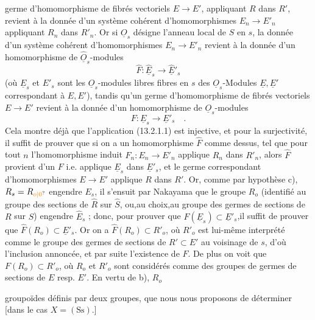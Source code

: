 germe d'homomorphisme de fibrés vectoriels $E\longrightarrow E'$, appliquant $R$ dans $R'$, revient à la donnée d'un système cohérent d'homomorphismes $E_n\longrightarrow E'_n$ appliquant $R_n$ dans $R'_n$. Or si $\underline O_s$ désigne l'anneau local de $S$ en $s$, la donnée d'un système cohérent d'homomorphismes $E_n\longrightarrow E'_n$ revient à la donnée d'un homomorphisme de $\widehat{\underline O}_s$-modules
\[
 \hat F:\widehat{\underline E}_s\longrightarrow\widehat{\underline E}'_s
\]
(où $\underline E_s$ et $E'_s$ sont les $\underline O_s$-modules libres fibres en $s$ des $\underline O_s$-Modules $\underline E,\underline E'$ correspondant à $E,E'$), tandis qu'un germe d'homomorphisme de fibrés vectoriels $E\longrightarrow E'$ revient à la donnée d'un homomorphisme de $\underline O_s$-modules
\[
 F:\underline E_s\longrightarrow\underline E'_s\quad.
\]
Cela montre déjà que l'application (13.2.1.1) est injective, et pour la surjectivité, il suffit de prouver que si on a un homomorphisme $\hat F$ comme dessus, tel que pour tout $n$ l'homomorphisme induit $F_n:E_n\longrightarrow E'_n$ applique $R_n$ dans $R'_n$, alors $\hat F$ provient d'un $F$ i.e. applique $\underline E_s$ dans $\underline E'_s$, et le germe correspondant d'homomorphismes $E\longrightarrow E'$ applique $R$ dans $R'$. Or, comme par hypothèse c), $R_s=R_{\unsure{o|0}}$ engendre $E_s$, il s'ensuit par Nakayama que le groupe $R_o$ (identifié au groupe des sections de $\hat R$ sur $\hat S$, ou,au choix,au groupe des germes de sections de $R$ sur $S$) engendre $\hat E_s$ ; donc, pour prouver que $\hat F(\underline E_s)\subset\underline E'_s$,il suffit de prouver que $\hat F(R_o)\subset\underline E'_s$. Or on a $\hat F(R_o)\subset R'_o$, où $R'_o$ est lui-même interprété comme le groupe des germes de sections de $R'\subset E'$ au voisinage de $s$, d'où l'inclusion annoncée, et par suite l'existence de $F$. De plus on voit que $F(R_o)\subset R'_o$, où $R_o$ et $R'_o$ sont considérés comme des groupes de germes de sections de $E$ resp. $E'$. En vertu de b), $R_o$

  groupoïdes  définis par deux groupes, que nous nous proposons de déterminer [dans le cas $X=(\mathrm{Ss})$.]


